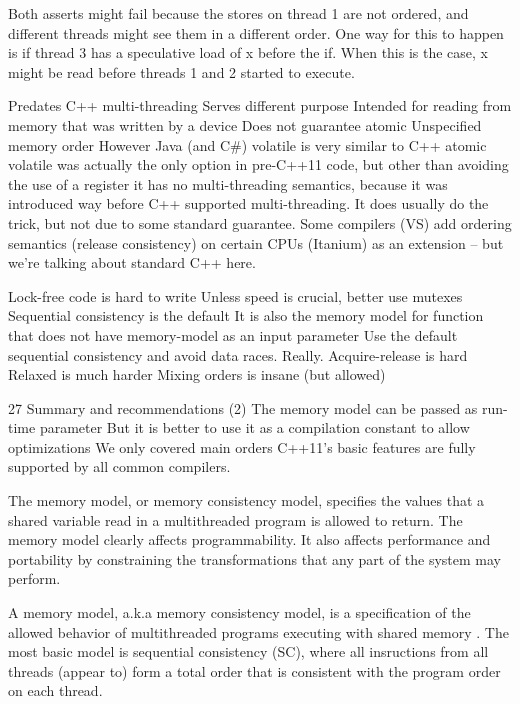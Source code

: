 Both asserts might fail because the stores on thread 1 are not ordered,
 and different threads might see them in a different order. 
 One way for this to happen is if thread 3 has a speculative load of x before 
 the if. When this is the case, x might be read before threads 1 and 2 
 started to execute.




Predates C++ multi-threading
Serves different purpose
Intended for reading from memory that was written by a device
Does not guarantee atomic
Unspecified memory order
However Java (and C#) volatile is very similar to C++ atomic
volatile was actually the only option in pre-C++11 code, but other than avoiding the use of a register it has no multi-threading semantics, because it was introduced way before C++ supported multi-threading. It does usually do the trick, but not due to some standard guarantee.
Some compilers (VS) add ordering semantics (release consistency) on certain CPUs (Itanium) as an extension – but we’re talking about standard C++ here.


Lock-free code is hard to write
Unless speed is crucial, better use mutexes
Sequential consistency is the default
It is also the memory model for function that does not have memory-model as an input parameter
Use the default sequential consistency and avoid data races. Really.
Acquire-release is hard
Relaxed is much harder
Mixing orders is insane (but allowed)

27 Summary and recommendations (2)
The memory model can be passed as run-time parameter
But it is better to use it as a compilation constant to allow optimizations
We only covered main orders
C++11’s basic features are fully supported by all common compilers.


The memory model, or memory consistency model, specifies the
values that a shared variable read in a multithreaded program is allowed to return. 
The memory model clearly affects programmability. 
It also affects performance and portability by constraining the
transformations that any part of the system may perform. 





A memory model, a.k.a memory consistency model, is a 
specification of the allowed behavior of multithreaded 
programs executing with shared memory . 
The most basic model is sequential consistency (SC), 
where all insructions from all threads (appear to) form a
 total order that is consistent with the program order on 
 each thread.



